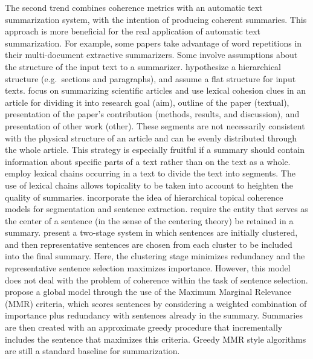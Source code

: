 The second trend combines coherence metrics with an automatic text summarization system, with the intention of producing coherent summaries.  
This approach is more beneficial for the real application of automatic text summarization. 
For example, some papers \cite{radev04a,nenkova05} take advantage of word repetitions in their \mbox{multi-document} extractive summarizers. 
Some involve assumptions about the structure of the input text to a summarizer. 
 hypothesize a hierarchical structure (e.g.\ sections and paragraphs), and  assume a flat structure for input texts. 
 focus on summarizing scientific articles and use lexical cohesion clues in an article for dividing it into research goal (aim), outline of the paper (textual), presentation of the paper's contribution (methods, results, and discussion), and presentation of other work (other). 
These segments are not necessarily consistent with the physical structure of an article and can be evenly distributed through the whole article. 
This strategy is especially fruitful if a summary should contain information about specific parts of a text rather than on the text as a whole.  
 employ lexical chains occurring in a text to divide the text into segments.  
The use of lexical chains allows topicality to be taken into account to heighten the quality of summaries.
 incorporate the idea of hierarchical topical coherence models for segmentation and sentence extraction. 
 require the entity that serves as the center of a sentence (in the sense of the centering theory) be retained in a summary. 
 present a \mbox{two-stage} system in which sentences are initially clustered, and then representative sentences are chosen from each cluster to be included into the final summary. 
Here, the clustering stage minimizes redundancy and the representative sentence selection maximizes importance.
However, this model does not deal with the problem of coherence within the task of sentence selection. 
 propose a global model through the use of the Maximum Marginal Relevance (MMR) criteria, which scores sentences by considering a weighted combination of importance plus redundancy with sentences already in the summary. 
Summaries are then created with an approximate greedy procedure that incrementally includes the sentence that maximizes this criteria. Greedy MMR style algorithms are still a standard baseline for summarization. 

